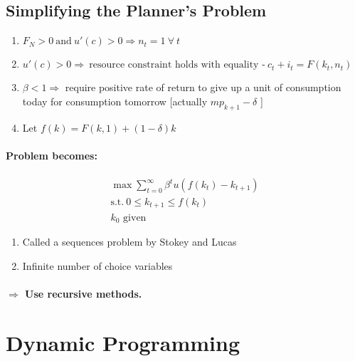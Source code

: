 \documentclass{article}
\begin{document}
\subsection{Simplifying the Planner's Problem}
\begin{enumerate}
    \item $F_N > 0\ \text{and}\ u'(c) > 0 \Rightarrow n_t = 1\ \forall \ t$
    \item $ u'(c) > 0 \Rightarrow \ \text{resource constraint holds with equality -}\ c_t + i_t = F(k_t,n_t)$
    \item $ \beta < 1 \Rightarrow$ require positive rate of return to give up a unit of consumption today for 
    consumption tomorrow [actually  $mp_{k+1}-\delta$ ]
    \item Let $f(k) = F(k,1) + (1-\delta)k$
\end{enumerate}

\paragraph{Problem becomes:}
\[
    \begin{aligned}
        \max_{} \sum_{t=0}^\infty \beta^t u(f(k_t) - k_{t+1})\\
        \text{s.t.}\ 
        0 \leq k_{t+1} \leq f(k_t)\\
        k_0 \text{ given}
    \end{aligned}
\]

\begin{enumerate}
    \item Called a sequences problem by Stokey and Lucas
    \item Infinite number of choice variables
\end{enumerate}

\paragraph{$\Rightarrow$ Use recursive methods.}

\section{Dynamic Programming}
\end{document}
